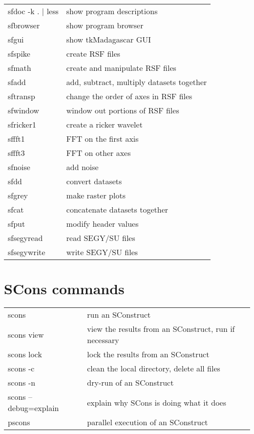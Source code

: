 \begin{tabular}{| l | l |}
   \hline 
   sfdoc -k . $|$ less & show program descriptions \\
   sfbrowser & show program browser \\
   sfgui & show tkMadagascar GUI \\
   sfspike & create RSF files \\
   sfmath & create and manipulate RSF files \\
   sfadd & add, subtract, multiply datasets together \\
   sftransp & change the order of axes in RSF files \\
   sfwindow & window out portions of RSF files \\
   sfricker1 & create a ricker wavelet \\
   sffft1 & FFT on the first axis \\
   sffft3 & FFT on other axes \\
   sfnoise & add noise  \\
   sfdd & convert datasets \\
   sfgrey & make raster plots \\
   sfcat & concatenate datasets together \\
   sfput & modify header values \\
   sfsegyread & read SEGY/SU files \\
   sfsegywrite & write SEGY/SU files \\
   \hline
\end{tabular}

\section{SCons commands}

\begin{tabular}{| l | l |}
    \hline
    scons & run an SConstruct \\
    scons view & view the results from an SConstruct, run if necessary \\
    scons lock & lock the results from an SConstruct \\
    scons -c & clean the local directory, delete all files \\
    scons -n & dry-run of an SConstruct \\
    scons --debug=explain & explain why SCons is doing what it does \\
    pscons & parallel execution of an SConstruct  \\
    \hline
\end{tabular}
